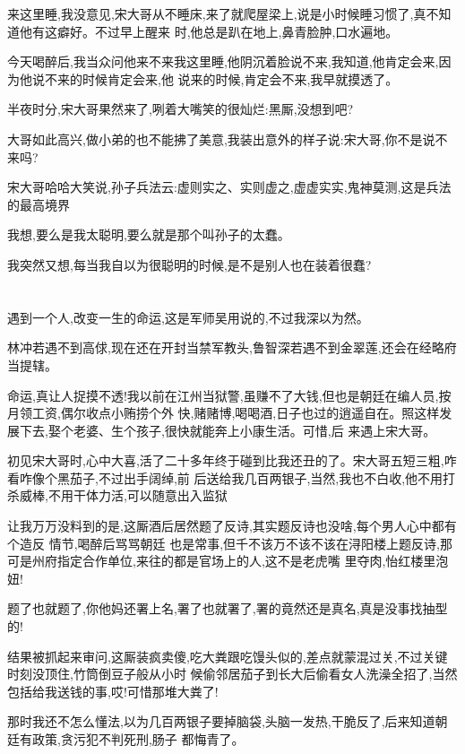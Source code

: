 ﻿\documentclass[12pt]{article}
\begin{document}
来这里睡,我没意见,宋大哥从不睡床,来了就爬屋梁上,说是小时候睡习惯了,真不知道他有这癖好。不过早上醒来
时,他总是趴在地上,鼻青脸肿,口水遍地。

今天喝醉后,我当众问他来不来我这里睡,他阴沉着脸说不来,我知道,他肯定会来,因为他说不来的时候肯定会来,他
说来的时候,肯定会不来,我早就摸透了。

半夜时分,宋大哥果然来了,咧着大嘴笑的很灿烂:黑厮,没想到吧?

大哥如此高兴,做小弟的也不能拂了美意,我装出意外的样子说:宋大哥,你不是说不来吗?

宋大哥哈哈大笑说,孙子兵法云:虚则实之、实则虚之,虚虚实实,鬼神莫测,这是兵法的最高境界

我想,要么是我太聪明,要么就是那个叫孙子的太蠢。

我突然又想,每当我自以为很聪明的时候,是不是别人也在装着很蠢?

\section{}

遇到一个人,改变一生的命运,这是军师吴用说的,不过我深以为然。

林冲若遇不到高俅,现在还在开封当禁军教头,鲁智深若遇不到金翠莲,还会在经略府当提辖。

命运,真让人捉摸不透!我以前在江州当狱警,虽赚不了大钱,但也是朝廷在编人员,按月领工资,偶尔收点小贿捞个外
快,赌赌博,喝喝酒,日子也过的逍遥自在。照这样发展下去,娶个老婆、生个孩子,很快就能奔上小康生活。可惜,后
来遇上宋大哥。

初见宋大哥时,心中大喜,活了二十多年终于碰到比我还丑的了。宋大哥五短三粗,咋看咋像个黑茄子,不过出手阔绰,前
后送给我几百两银子,当然,我也不白收,他不用打杀威棒,不用干体力活,可以随意出入监狱\dldots

让我万万没料到的是,这厮酒后居然题了反诗,其实题反诗也没啥,每个男人心中都有个造反 情节,喝醉后骂骂朝廷
也是常事,但千不该万不该不该在浔阳楼上题反诗,那可是州府指定合作单位,来往的都是官场上的人,这不是老虎嘴
里夺肉,怡红楼里泡妞!

题了也就题了,你他妈还署上名,署了也就署了,署的竟然还是真名,真是没事找抽型的!

结果被抓起来审问,这厮装疯卖傻,吃大粪跟吃馒头似的,差点就蒙混过关,不过关键时刻没顶住,竹筒倒豆子般从小时
候偷邻居茄子到长大后偷看女人洗澡全招了,当然包括给我送钱的事,哎!可惜那堆大粪了!

那时我还不怎么懂法,以为几百两银子要掉脑袋,头脑一发热,干脆反了,后来知道朝廷有政策,贪污犯不判死刑,肠子
都悔青了。

\section{}
\end{document}

